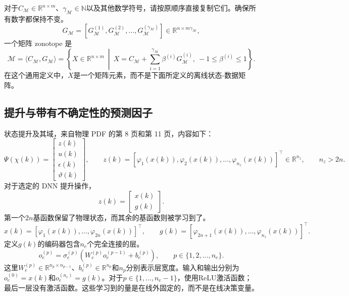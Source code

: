 \documentclass{article}
\begin{document}
对于$C_{\mathcal{M}}\in\mathbb{R}^{n\times m}$、$\gamma_{\mathcal{M}}\in\mathbb{N}$以及其他数学符号，请按原顺序直接复制它们。确保所有数字都保持不变。
\[
G_{\mathcal{M}}=[G_{\mathcal{M}}^{(1)},G_{\mathcal{M}}^{(2)},\ldots,G_{\mathcal{M}}^{(\gamma_{\mathcal{M}})}]\in\mathbb{R}^{n\times m\gamma_{\mathcal{M}}},
\]
一个矩阵 zonotope 是
\begin{equation}
\mathcal{M}=\langle C_{\mathcal{M}},G_{\mathcal{M}}\rangle
=\left\{X\in\mathbb{R}^{n\times m}\ \middle|\ X=C_{\mathcal{M}}+\sum_{i=1}^{\gamma_{\mathcal{M}}}\beta^{(i)}G_{\mathcal{M}}^{(i)},\ -1\leq\beta^{(i)}\leq1\right\}. \tag{6}
\end{equation}
在这个通用定义中，$X$是一个矩阵元素，而不是下面所定义的离线状态-数据矩阵。

\subsection*{提升与带有不确定性的预测因子}
状态提升及其域，来自物理 PDF 的第 8 页和第 11 页，内容如下：
\begin{equation}
\Psi(\chi(k))=\begin{bmatrix}z(k)\\u(k)\\\epsilon(k)\\\vartheta(k)\end{bmatrix},\qquad
z(k)=[\varphi_1(x(k)),\varphi_2(x(k)),\ldots,\varphi_{n_z}(x(k))]^\top\in\mathbb{R}^{n_z},\qquad n_z>2n. \tag{19}
\end{equation}
对于选定的 DNN 提升操作，
\begin{equation}
z(k)=\begin{bmatrix}x(k)\\g(k)\end{bmatrix}. \tag{26}
\end{equation}
第一个$2n$基函数保留了物理状态，而其余的基函数则被学习到了。
\[
x(k)=[\varphi_1(x(k)),\ldots,\varphi_{2n}(x(k))]^\top,\qquad
g(k)=[\varphi_{2n+1}(x(k)),\ldots,\varphi_{n_z}(x(k))]^\top.
\]
定义$g(k)$的编码器包含$n_e$个完全连接的层。
\begin{equation}
o_e^{(p)}=\sigma_e^{(p)}\left(W_e^{(p)}o_e^{(p-1)}+b_e^{(p)}\right),\qquad p\in\{1,2,\ldots,n_e\}. \tag{27}
\end{equation}
这里$W_e^{(p)}\in\mathbb{R}^{n_p\times n_{p-1}}$、$b_e^{(p)}\in\mathbb{R}^{n_p}$和$n_p$分别表示层宽度。输入和输出分别为$o_e^{(0)}=x(k)$和$o_e^{(n_e)}=g(k)$。对于$p\in\{1,\ldots,n_e-1\}$，使用ReLU激活函数；最后一层没有激活函数。这些学习到的量是在线外固定的，而不是在线决策变量。
\end{document}
